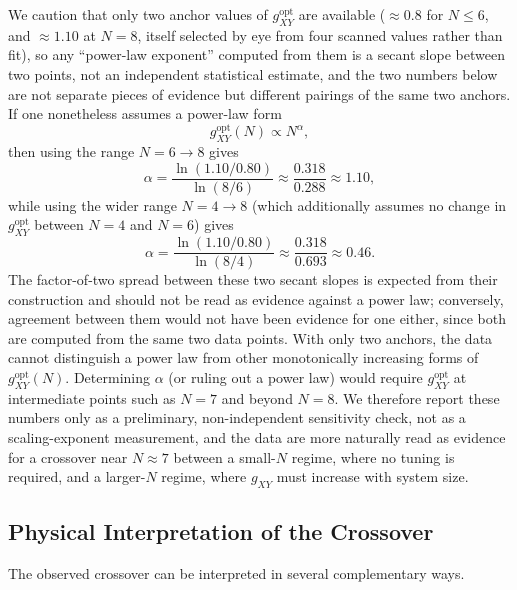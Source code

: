 \documentclass[12pt,a4paper]{article}
\begin{document}
We caution that only two anchor values of $g_{XY}^{\mathrm{opt}}$ are
available ($\approx 0.8$ for $N\le 6$, and $\approx 1.10$ at $N=8$, itself
selected by eye from four scanned values rather than fit), so any
``power-law exponent'' computed from them is a secant slope between two
points, not an independent statistical estimate, and the two numbers below
are not separate pieces of evidence but different pairings of the same two
anchors. If one nonetheless assumes a power-law form
\[
g_{XY}^{\mathrm{opt}}(N) \propto N^\alpha,
\]
then using the range $N=6 \rightarrow 8$ gives
\[
\alpha
= \frac{\ln(1.10/0.80)}{\ln(8/6)}
\approx
\frac{0.318}{0.288}
\approx 1.10,
\]
while using the wider range $N=4 \rightarrow 8$ (which additionally assumes
no change in $g_{XY}^{\mathrm{opt}}$ between $N=4$ and $N=6$) gives
\[
\alpha
= \frac{\ln(1.10/0.80)}{\ln(8/4)}
\approx
\frac{0.318}{0.693}
\approx 0.46.
\]
The factor-of-two spread between these two secant slopes is expected from
their construction and should not be read as evidence against a power law;
conversely, agreement between them would not have been evidence for one
either, since both are computed from the same two data points. With only
two anchors, the data cannot distinguish a power law from other
monotonically increasing forms of $g_{XY}^{\mathrm{opt}}(N)$. Determining
$\alpha$ (or ruling out a power law) would require $g_{XY}^{\mathrm{opt}}$
at intermediate points such as $N=7$ and beyond $N=8$. We therefore report
these numbers only as a preliminary, non-independent sensitivity check, not
as a scaling-exponent measurement, and the data are more naturally read as
evidence for a crossover near $N \approx 7$ between a small-$N$ regime,
where no tuning is required, and a larger-$N$ regime, where $g_{XY}$ must
increase with system size.

\subsection{Physical Interpretation of the Crossover}\label{sec:crossover_interpretation}

The observed crossover can be interpreted in several complementary ways.
\end{document}
